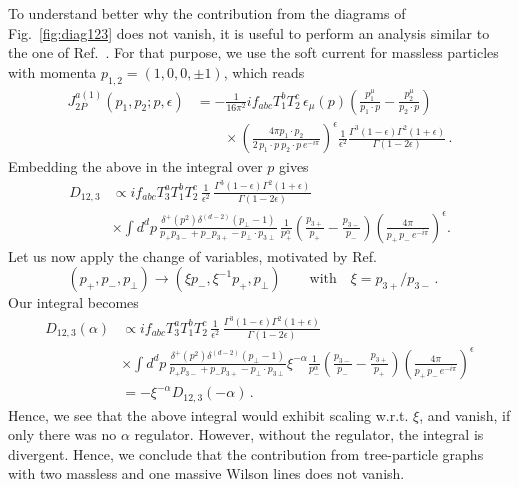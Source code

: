 \documentclass[a4paper,11pt]{article}
\numberwithin{equation}{section}
\begin{document}
To understand better why the contribution from the diagrams of
Fig.~\ref{fig:diag123} does not vanish, it is useful to perform an analysis
similar to the one of Ref.~\cite{Aybat:2006wq}. For that purpose, we use the
soft current for massless particles with momenta $p_{1,2} = (1,0,0,\pm 1)$,
which reads~\cite{Catani:2000pi}
%
\begin{align}
  J_{2P}^{a(1)}(p_1,p_2;p, \epsilon) & = 
  -\frac{1}{16\pi^2}  i f_{abc} T_1^b T_2^c\, \epsilon_\mu(p)
  \left(\frac{p_1^\mu}{p_1\cdot p}- \frac{p_2^\mu}{p_2\cdot p}\right)
  \nonumber \\[0.5em]
  & \quad \quad \times
  \left(\frac{4\pi p_1\cdot p_2}{2\, p_1 \cdot p\ p_2 \cdot p\, e^{-i\pi}}
  \right)^\epsilon
  \frac{1}{\epsilon^2}
  \frac{\Gamma^3(1-\epsilon)\Gamma^2(1+\epsilon)}{\Gamma(1-2\epsilon)}\,.
\end{align}
%
Embedding the above in the integral over $p$ gives
%
\begin{align}
  D_{12,3} & \propto i f_{abc} T_3^a T_1^b T_2^c\,
  \frac{1}{\epsilon^2}\,
  \frac{\Gamma^3(1-\epsilon)\Gamma^2(1+\epsilon)}{\Gamma(1-2\epsilon)}
  \nonumber \\
  & \times
  \int d^d p\,
  \frac{\delta^+(p^2)\delta^{(d-2)}(p_\perp-1)}
       {p_+ p_{3-}+p_- p_{3+}-p_\perp \cdot p_{3\perp}}\,
  \frac{1}{p_+^\alpha}
  \left(\frac{p_{3+}}{p_+}- \frac{p_{3-}}{p_-}\right)
  \left(\frac{4\pi}{p_+\, p_-\, e^{-i\pi}}
  \right)^\epsilon.
\end{align}
%
Let us now apply the change of variables, motivated by Ref.~\cite{Aybat:2006wq}
%
\begin{equation}
  (p_+,p_-,p_\perp) \to (\xi p_-,\xi^{-1} p_+,p_\perp)
  \qquad
  \text{with} 
  \quad
  \xi = p_{3+}/p_{3-}\,.
  \quad
  \label{eq:xiscaling}
\end{equation}
%
Our integral becomes
%
\begin{align}
  D_{12,3} (\alpha) & \propto i f_{abc}  T_3^a T_1^b T_2^c \,
  \frac{1}{\epsilon^2}\,
  \frac{\Gamma^3(1-\epsilon)\Gamma^2(1+\epsilon)}{\Gamma(1-2\epsilon)}
  \nonumber \\
  & \times
  \int d^d p\, 
  \frac{\delta^+(p^2)\delta^{(d-2)}(p_\perp-1)}
       {p_+ p_{3-}+p_- p_{3+}-p_\perp \cdot
  p_{3\perp}}
  \xi^{-\alpha}\frac{1}{p_-^\alpha}
  \left(\frac{p_{3-}}{p_-} - \frac{p_{3+}}{p_+}\right)
  \left(\frac{4\pi}{p_+\, p_-\, e^{-i\pi}}
  \right)^\epsilon
  \nonumber \\
  & = - \xi^{-\alpha} D_{12,3}(-\alpha)\,.
\end{align}
%
Hence, we see that the above integral would exhibit scaling w.r.t. $\xi$, and
vanish, if only there was no $\alpha$ regulator. However, without the regulator,
the integral is divergent. Hence, we conclude that the contribution from
tree-particle graphs with two massless and one massive Wilson lines does not
vanish.
\end{document}
